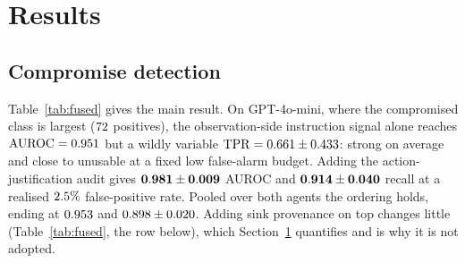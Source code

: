 \documentclass[preprint,12pt,authoryear]{elsarticle}
\theoremstyle{definition}
\begin{document}
\section{Results}\label{sec:results}

\subsection{Compromise detection}

Table~\ref{tab:fused} gives the main result. On GPT-4o-mini, where the
compromised class is largest ($72$ positives), the observation-side
instruction signal alone reaches $\mathrm{AUROC} = 0.951$ but a wildly
variable $\mathrm{TPR} = 0.661 \pm 0.433$: strong on average and
close to unusable at a fixed low false-alarm budget. Adding the
action-justification audit gives $\mathbf{0.981 \pm 0.009}$ AUROC
and $\mathbf{0.914 \pm 0.040}$ recall at a realised
$2.5\%$ false-positive rate. Pooled over both agents the ordering holds,
ending at $0.953$ and $0.898 \pm 0.020$. Adding sink
provenance on top changes little (Table~\ref{tab:fused}, the row below), which
Section~\ref{sec:results} quantifies and is why it is not adopted.
\end{document}
